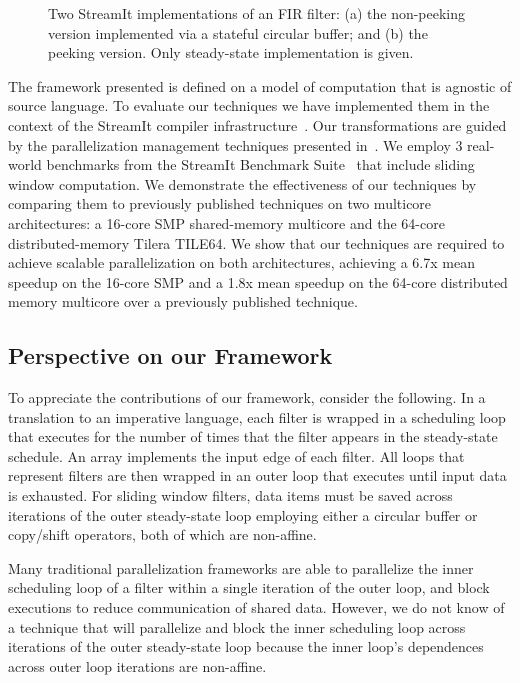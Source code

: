 \begin{figure}[t]
\caption[Two implementations of an FIR filter.]{\label{fig:fir-code}
  Two StreamIt implementations of an FIR filter:
   (a) the non-peeking version implemented via a
  stateful circular buffer; and (b) the peeking version. Only steady-state implementation is
  given.}
\end{figure}

The framework presented is defined on a model of computation that is
agnostic of source language.  To evaluate our techniques we have
implemented them in the context of the StreamIt compiler
infrastructure~\cite{gordon-asplos06}.  Our transformations are guided
by the parallelization management techniques presented
in~\cite{gordon-asplos06}.  We employ 3 real-world benchmarks from the
StreamIt Benchmark Suite~\cite{streamit-suite} that include sliding
window computation.  We demonstrate the effectiveness of our
techniques by comparing them to previously published techniques on two
multicore architectures: a 16-core SMP shared-memory multicore and the
64-core distributed-memory Tilera TILE64.  We show that
our techniques are required to achieve scalable parallelization on
both architectures, achieving a 6.7x mean speedup on the 16-core SMP
and a 1.8x mean speedup on the 64-core distributed memory multicore
over a previously published technique.

\subsection{Perspective on our Framework}

To appreciate the contributions of our framework, consider the
following.  In a translation to an imperative language, each filter is
wrapped in a scheduling loop that executes for the number of times
that the filter appears in the steady-state schedule. An array
implements the input edge of each filter.  All loops that represent
filters are then wrapped in an outer loop that executes until input
data is exhausted.  For sliding window filters, data items must be
saved across iterations of the outer steady-state loop employing
either a circular buffer or copy/shift operators, both of which are
non-affine.

Many traditional parallelization frameworks are able to parallelize
the inner scheduling loop of a filter within a single iteration of the
outer loop, and block executions to reduce communication of shared
data.  However, we do not know of a technique that will parallelize
and block the inner scheduling loop across iterations of the outer
steady-state loop because the inner loop's dependences across outer
loop iterations are non-affine.

